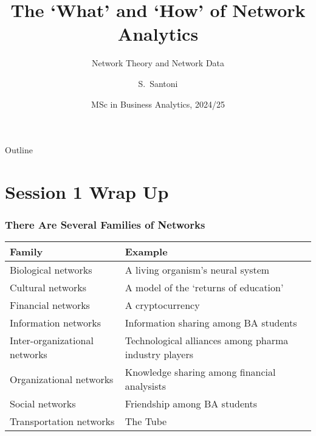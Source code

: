 \documentclass[notes, aspectratio=1610]{beamer}
\title[Network Theory and Network Data]
{The `What' and `How' of Network Analytics}
\subtitle{Network Theory and Network Data}
\author{S.~Santoni\inst{1}\inst{2}}
\institute{
	\inst{1}%
	Bayes Business School
	}
\date{MSc in Business Analytics, 2024/25}
\begin{document}
\begin{frame}
	\titlepage
\end{frame}

\begin{frame}{Outline}
	\tableofcontents
\end{frame}

\section{Session 1 Wrap Up}

\begin{frame}
	\frametitle{There Are Several Families of Networks}
	\begin{table}
		\begin{small}
		\begin{center}
		\begin{tabular}[c]{p{4.5cm}|l}
			\textbf{Family} & 
			\textbf{Example} \\
			\hline 
			\rowcolor{gray!20}
			Biological networks\dotfill
			& A living organism's neural system\\
		        Cultural networks\dotfill
			& A model of the `returns of education'\\
			\rowcolor{gray!20}
			Financial networks\dotfill
			& A cryptocurrency\\
			Information networks\dotfill
			& Information sharing among BA students\\
			\rowcolor{gray!20}
			Inter-organizational networks\dotfill
			& Technological alliances among pharma industry players\\
		        Organizational networks\dotfill
			& Knowledge sharing among financial analysists\\
    			\rowcolor{gray!20}       
			Social networks\dotfill
			& Friendship among BA students\\
		        Transportation networks\dotfill
			& The Tube\\				
		\end{tabular}
		\end{center}
		\end{small}
	\end{table}
\end{frame}
\end{document}
